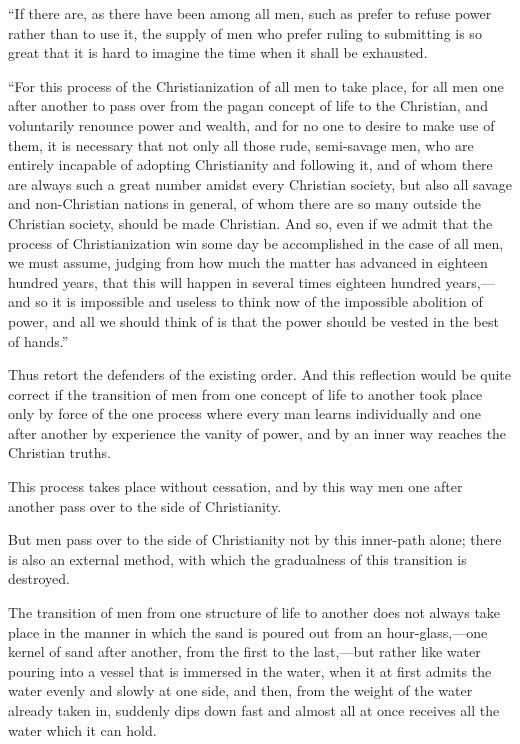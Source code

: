 \documentclass{book}
\begin{document}
“If there are, as there have been among all men, such as prefer to refuse power rather than to use it, the supply of men who prefer ruling to submitting is so great that it is hard to imagine the time when it shall be exhausted.

“For this process of the Christianization of all men to take place, for all men one after another to pass over from the pagan concept of life to the Christian, and voluntarily renounce power and wealth, and for no one to desire to make use of them, it is necessary that not only all those rude, semi-savage men, who are entirely incapable of adopting Christianity and following it, and of whom there are always such a great number amidst every Christian society, but also all savage and non-Christian nations in general, of whom there are so many outside the Christian society, should be made Christian. And so, even if we admit that the process of Christianization win some day be accomplished in the case of all men, we must assume, judging from how much the matter has advanced in eighteen hundred years, that this will happen in several times eighteen hundred years,—and so it is impossible and useless to think now of the impossible abolition of power, and all we should think of is that the power should be vested in the best of hands.”

Thus retort the defenders of the existing order. And this reflection would be quite correct if the transition of men from one concept of life to another took place only by force of the one process where every man learns individually and one after another by experience the vanity of power, and by an inner way reaches the Christian truths.

This process takes place without cessation, and by this way men one after another pass over to the side of Christianity.

But men pass over to the side of Christianity not by this inner-path alone; there is also an external method, with which the gradualness of this transition is destroyed.

The transition of men from one structure of life to another does not always take place in the manner in which the sand is poured out from an hour-glass,—one kernel of sand after another, from the first to the last,—but rather like water pouring into a vessel that is immersed in the water, when it at first admits the water evenly and slowly at one side, and then, from the weight of the water already taken in, suddenly dips down fast and almost all at once receives all the water which it can hold.
\end{document}

